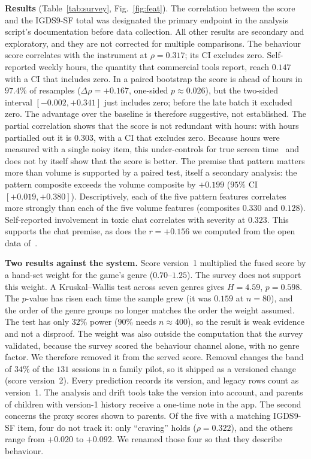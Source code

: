 \documentclass[conference]{IEEEtran}
\begin{document}
\textbf{Results} (Table~\ref{tab:survey}, Fig.~\ref{fig:feat}). The correlation between
the score and the IGDS9-SF total was designated the primary endpoint in the analysis
script's documentation before data collection. All other results are secondary and
exploratory, and they are not corrected for multiple comparisons. The behaviour score
correlates with the instrument at $\rho{=}0.317$; its CI excludes zero. Self-reported
weekly hours, the quantity that commercial tools report, reach $0.147$ with a CI that
includes zero. In a paired bootstrap the score is ahead of hours in $97.4\%$ of
resamples ($\Delta\rho{=}{+}0.167$, one-sided $p{\approx}0.026$), but the two-sided
interval $[-0.002,+0.341]$ just includes zero; before the late batch it excluded zero.
The advantage over the baseline is therefore suggestive, not established. The partial
correlation shows that the score is not redundant with hours: with hours partialled out
it is $0.303$, with a CI that excludes zero. Because hours were measured with a single
noisy item, this under-controls for true screen time~\cite{westfall2016} and does not
by itself show that the score is better. The premise that pattern matters more than
volume is supported by a paired test, itself a secondary analysis: the pattern
composite exceeds the volume composite by $+0.199$ ($95\%$ CI $[+0.019,+0.380]$).
Descriptively, each of the five pattern features correlates more strongly than each of
the five volume features (composites $0.330$ and $0.128$). Self-reported involvement in
toxic chat correlates with severity at $0.323$. This supports the chat premise, as does
the $r{=}{+}0.156$ we computed from the open data of~\cite{igdslatam2024}.

\textbf{Two results against the system.} Score version~1 multiplied the fused score by
a hand-set weight for the game's genre ($0.70$--$1.25$). The survey does not support
this weight. A Kruskal--Wallis test across seven genres gives $H{=}4.59$, $p{=}0.598$.
The $p$-value has risen each time the sample grew (it was $0.159$ at $n{=}80$), and the
order of the genre groups no longer matches the order the weight assumed. The test has
only $32\%$ power ($90\%$ needs $n\!\approx\!400$), so the result is weak evidence and
not a disproof. The weight was also outside the computation that the survey validated,
because the survey scored the behaviour channel alone, with no genre factor. We
therefore removed it from the served score. Removal changes the band of $34\%$ of the
$131$ sessions in a family pilot, so it shipped as a versioned change (score
version~2). Every prediction records its version, and legacy rows count as version~1.
The analysis and drift tools take the version into account, and parents of children
with version-1 history receive a one-time note in the app. The second concerns the
proxy scores shown to parents. Of the five with a matching IGDS9-SF item, four do not
track it: only ``craving'' holds ($\rho{=}0.322$), and the others range from $+0.020$
to $+0.092$. We renamed those four so that they describe behaviour.
\end{document}
